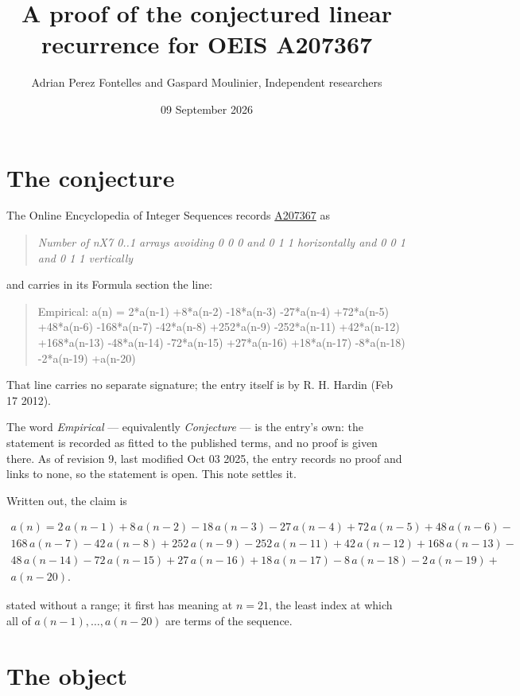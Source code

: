 \documentclass[11pt]{article}
\title{A proof of the conjectured linear recurrence for OEIS A207367}
\author{Adrian Perez Fontelles and Gaspard Moulinier, Independent researchers}
\date{09 September 2026}
\theoremstyle{definition}
\begin{document}
\maketitle
\section{The conjecture}

The Online Encyclopedia of Integer Sequences records \href{https://oeis.org/A207367}{A207367} as

\begin{quote}\itshape Number of nX7 0..1 arrays avoiding 0 0 0 and 0 1 1 horizontally and 0 0 1 and 0 1 1 vertically\end{quote}

and carries in its Formula section the line:

\begin{quote}\ttfamily Empirical: a(n) = 2*a(n-1) +8*a(n-2) -18*a(n-3) -27*a(n-4) +72*a(n-5) +48*a(n-6) -168*a(n-7) -42*a(n-8) +252*a(n-9) -252*a(n-11) +42*a(n-12) +168*a(n-13) -48*a(n-14) -72*a(n-15) +27*a(n-16) +18*a(n-17) -8*a(n-18) -2*a(n-19) +a(n-20)\end{quote}

That line carries no separate signature; the entry itself is by R. H. Hardin (Feb 17 2012).

The word {\itshape Empirical} --- equivalently {\itshape Conjecture} --- is the entry's own: the statement is recorded as fitted to the published terms, and no proof is given there. As of revision 9, last modified Oct 03 2025, the entry records no proof and links to none, so the statement is open. This note settles it.

Written out, the claim is

\begin{multline*} a(n) = 2\,a(n-1) + 8\,a(n-2) - 18\,a(n-3) - 27\,a(n-4) + 72\,a(n-5) + 48\,a(n-6) - \\ 168\,a(n-7) - 42\,a(n-8) + 252\,a(n-9) - 252\,a(n-11) + 42\,a(n-12) + 168\,a(n-13) - \\ 48\,a(n-14) - 72\,a(n-15) + 27\,a(n-16) + 18\,a(n-17) - 8\,a(n-18) - 2\,a(n-19) + \\ a(n-20). \end{multline*}

stated without a range; it first has meaning at $n = 21$, the least index at which all of $a(n-1),\dots,a(n-20)$ are terms of the sequence.

\section{The object}
\end{document}
